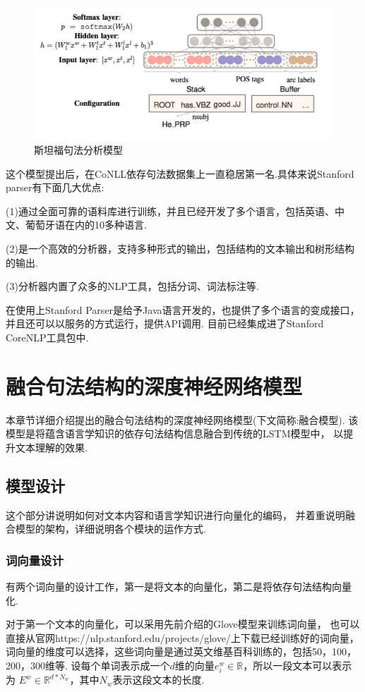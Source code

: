 \documentclass[bachelor,adobefonts]{jnuthesis}
\begin{document}
\begin{figure}[h!]
  \centering
  \includegraphics[width=0.85\linewidth]{斯坦福句法分析模型.png}
  \caption{斯坦福句法分析模型}
\end{figure}

这个模型提出后，在CoNLL依存句法数据集上一直稳居第一名.具体来说Stanford parser有下面几大优点:

(1)通过全面可靠的语料库进行训练，并且已经开发了多个语言，包括英语、中文、葡萄牙语在内的10多种语言.

(2)是一个高效的分析器，支持多种形式的输出，包括结构的文本输出和树形结构的输出.

(3)分析器内置了众多的NLP工具，包括分词、词法标注等.

在使用上Stanford Parser是给予Java语言开发的，也提供了多个语言的变成接口，
并且还可以以服务的方式运行，提供API调用.
目前已经集成进了Stanford CoreNLP工具包中.



\chapter{融合句法结构的深度神经网络模型}
本章节详细介绍提出的融合句法结构的深度神经网络模型(下文简称:融合模型).
该模型是将蕴含语言学知识的依存句法结构信息融合到传统的LSTM模型中，
以提升文本理解的效果.
\section{模型设计}
这个部分讲说明如何对文本内容和语言学知识进行向量化的编码，
并着重说明融合模型的架构，详细说明各个模块的运作方式.
\subsection{词向量设计}
有两个词向量的设计工作，第一是将文本的向量化，第二是将依存句法结构向量化.

对于第一个文本的向量化，可以采用先前介绍的Glove模型来训练词向量，
也可以直接从官网https://nlp.stanford.edu/projects/glove/上下载已经训练好的词向量，
词向量的维度可以选择，这些词向量是通过英文维基百科训练的，包括50，100，200，300维等.
设每个单词表示成一个$d$维的向量$e_{i}^{w} \in \mathbb{R}$，所以一段文本可以表示为
$E^{w} \in \mathbb{R}^{d*N_{w}}$，其中$N_{w}$表示这段文本的长度.
\end{document}
